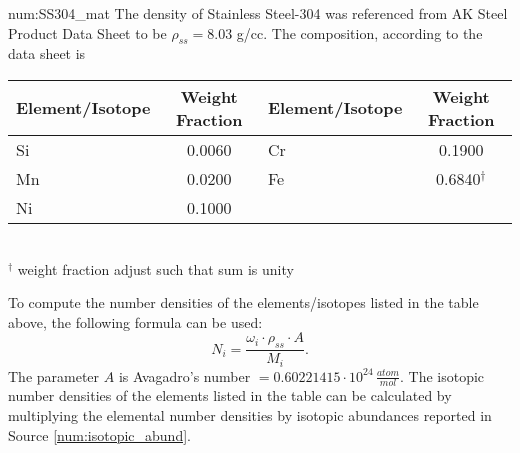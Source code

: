\begin{numitem}{num:SS304_mat}
   The density of Stainless Steel-304 was referenced from AK Steel Product Data Sheet to be $\rho_{ss} = 8.03$ g/cc.  The composition, according to the data sheet is
 \begin{center}
  \begin{tabular}{l c l c}
    \toprule
    Element/Isotope & Weight Fraction & Element/Isotope & Weight Fraction \\
    \midrule
    \midrule
Si   &  0.0060  &  Cr  &   0.1900 \\
Mn   &  0.0200  &  Fe  &   0.6840$^\dagger$   \\
Ni   &  0.1000  &   &    \\
    \bottomrule
  \end{tabular}
  \\$^\dagger$ weight fraction adjust such that sum is unity
 \end{center}

To compute the number densities of the elements/isotopes listed in the table above, the following formula can be used:
\[
    N_i = \frac{\omega_i\cdot\rho_{ss}\cdot A}{M_i}.
\]
The parameter $A$ is Avagadro's number $=0.60221415\cdot 10^{24}\,\frac{atom}{mol}$. The isotopic number densities of the elements listed in the table can be calculated by multiplying the elemental number densities by isotopic abundances reported in Source \ref{num:isotopic_abund}.


\end{numitem}

